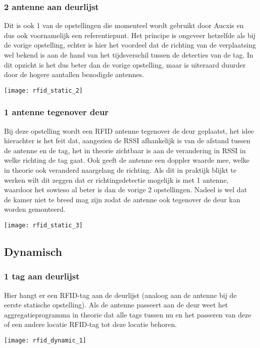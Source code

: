 \subsubsection{2 antenne aan deurlijst}
\begin{minipage}{0.65\textwidth}
Dit is ook 1 van de opstellingen die momenteel wordt gebruikt door Aucxis en dus ook voornamelijk een referentiepunt. Het principe is ongeveer hetzelfde als bij de vorige opstelling, echter is hier het voordeel dat de richting van de verplaatsing wel bekend is aan de hand van het tijdsverschil tussen de detecties van de tag. In dit opzicht is het dus beter dan de vorige opstelling, maar is uiteraard duurder door de hogere aantallen benodigde antennes. 
\end{minipage}
\hfill
\begin{minipage}{0.30\textwidth}
	\texttt{[image: rfid\_static\_2]}
\end{minipage}

\subsubsection{1 antenne tegenover deur}
\begin{minipage}{0.65\textwidth}
Bij deze opstelling wordt een RFID antenne tegenover de deur geplaatst, het idee hierachter is het feit dat, aangezien de RSSI afhankelijk is van de afstand tussen de antenne en de tag, het in theorie zichtbaar is aan de verandering in RSSI in welke richting de tag gaat. Ook geeft de antenne een doppler waarde mee, welke in theorie ook veranderd naargelang de richting. Als dit in praktijk blijkt te werken wilt dit zeggen dat er richtingsdetectie mogelijk is met 1 antenne, waardoor het sowieso al beter is dan de vorige 2 opstellingen. Nadeel is wel dat de kamer niet te breed mag zijn zodat de antenne ook tegenover de deur kan worden gemonteerd.
\end{minipage}
\hfill
\begin{minipage}{0.30\textwidth}
	\texttt{[image: rfid\_static\_3]}
\end{minipage}
\subsection{Dynamisch}

\subsubsection{1 tag aan deurlijst}
\begin{minipage}{0.65\textwidth}
Hier hangt er een RFID-tag aan de deurlijst (analoog aan de antenne bij de eerste statische opstelling). Als de antenne passeert aan de deur weet het aggregatieprogramma in theorie dat alle tags tussen nu en het passeren van deze of een andere locatie RFID-tag tot deze locatie behoren.
\end{minipage}
\hfill
\begin{minipage}{0.30\textwidth}
	\texttt{[image: rfid\_dynamic\_1]}
\end{minipage}

